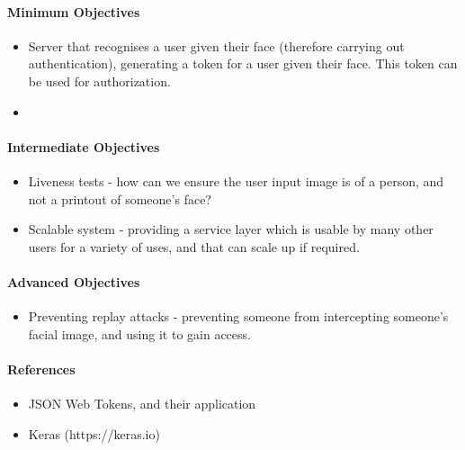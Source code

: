\documentclass{article}
\begin{document}
    \paragraph{Minimum Objectives}
        \begin{itemize}
            \item Server that recognises a user given their face (therefore carrying out authentication), generating a token for a user given their face. This token can be used for authorization.
            \item 
        \end{itemize}
    \paragraph{Intermediate Objectives}
        \begin{itemize}
            \item Liveness tests - how can we ensure the user input image is of a person, and not a printout of someone's face?
            \item Scalable system - providing a service layer which is usable by many other users for a variety of uses, and that can scale up if required.
        \end{itemize}
    \paragraph{Advanced Objectives}
        \begin{itemize}
            \item Preventing replay attacks - preventing someone from intercepting someone's facial image, and using it to gain access.
        \end{itemize}
    \paragraph{References}
        \begin{itemize}
            \item JSON Web Tokens, and their application
            \item Keras (https://keras.io)
        \end{itemize}
\end{document}
